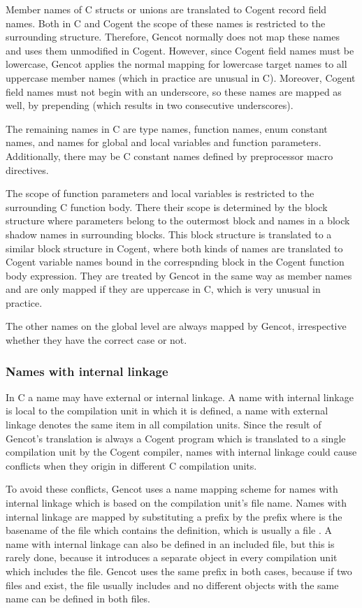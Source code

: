 Member names of C structs or unions are translated to Cogent record field names. Both in C and Cogent the scope of these
names is restricted to the surrounding structure. Therefore, Gencot normally does not map these names and uses them unmodified
in Cogent. However, since Cogent field names must be lowercase, Gencot applies the normal mapping for lowercase target 
names to all uppercase member names (which in practice are unusual in C). Moreover, Cogent field names must not begin
with an underscore, so these names are mapped as well, by prepending  (which results in two consecutive 
underscores).

The remaining names in C are type names, function names, enum constant names, and names for global and local variables and
function parameters. Additionally, there may be C constant names defined by preprocessor macro directives.

The scope of function parameters and local variables is restricted to the surrounding C function body. There their scope
is determined by the block structure where parameters belong to the outermost block and names in a block shadow names in
surrounding blocks. This block structure is translated to a similar block structure in Cogent, where both kinds of names
are translated to Cogent variable names bound in the correspnding block in the Cogent function body expression. They are
treated by Gencot in the same way as member names and are only mapped if they are uppercase in C, which is very unusual
in practice.

The other names on the global level are always mapped by Gencot, irrespective whether they have the correct case or not.

\subsubsection{Names with internal linkage}

In C a name may have external or internal linkage. A name with internal linkage is local to the compilation unit in which it
is defined, a name with external linkage denotes the same item in all compilation units. Since the result of Gencot's 
translation is always a Cogent program which is translated to a single compilation unit by the Cogent compiler, names 
with internal linkage could cause conflicts when they origin in different C compilation units.

To avoid these conflicts, Gencot uses a name mapping scheme for names with internal linkage which is based on the 
compilation unit's file name. Names with internal linkage are mapped by substituting a prefix by the prefix 
where  is the basename of the file which contains the definition, which is usually a file . A name with
internal linkage can also be defined in an included file, but this is rarely done, because it introduces a separate object
in every compilation unit which includes the file. Gencot uses the same prefix in both cases, because if two files 
and  exist, the file  usually includes  and no different objects with the same name can be defined 
in both files. 

